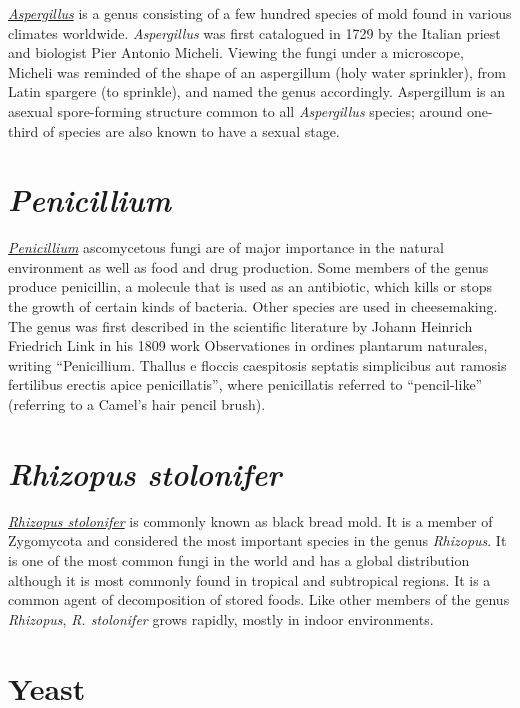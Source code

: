 \href{https://en.wikipedia.org/wiki/Aspergillus}{\emph{Aspergillus}} is
a genus consisting of a few hundred species of mold found in various
climates worldwide. \emph{Aspergillus} was first catalogued in 1729 by the
Italian priest and biologist Pier Antonio Micheli. Viewing the fungi
under a microscope, Micheli was reminded of the shape of an aspergillum
(holy water sprinkler), from Latin spargere (to sprinkle), and named the
genus accordingly. Aspergillum is an asexual spore-forming structure
common to all \emph{Aspergillus} species; around one-third of species are also
known to have a sexual stage.

\section{\texorpdfstring{\emph{Penicillium}}{Penicillium}}\label{penicillium}

\href{https://en.wikipedia.org/wiki/Penicillium}{\emph{Penicillium}}
ascomycetous fungi are of major importance in the natural environment as
well as food and drug production. Some members of the genus produce
penicillin, a molecule that is used as an antibiotic, which kills or
stops the growth of certain kinds of bacteria. Other species are used in
cheesemaking. The genus was first described in the scientific literature
by Johann Heinrich Friedrich Link in his 1809 work Observationes in
ordines plantarum naturales, writing ``Penicillium. Thallus e floccis
caespitosis septatis simplicibus aut ramosis fertilibus erectis apice
penicillatis'', where penicillatis referred to ``pencil-like''
(referring to a Camel's hair pencil brush).

\section{\texorpdfstring{\emph{Rhizopus
stolonifer}}{Rhizopus stolonifer}}\label{rhizopus-stolonifer}

\href{https://en.wikipedia.org/wiki/Rhizopus_stolonifer}{\emph{Rhizopus
stolonifer}} is commonly known as black bread mold. It is a member of
Zygomycota and considered the most important species in the genus
\emph{Rhizopus}. It is one of the most common fungi in the world and has a
global distribution although it is most commonly found in tropical and
subtropical regions. It is a common agent of decomposition of stored
foods. Like other members of the genus \emph{Rhizopus}, \emph{R. stolonifer} grows
rapidly, mostly in indoor environments.

\section{Yeast}\label{yeast}

